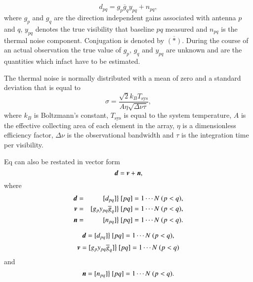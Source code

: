 \documentclass[a4paper,fleqn,usenatbib]{mnras}
\newcommand{\bd}{\bmath{d}}
\newcommand{\bv}{\bmath{v}}
\newcommand{\bn}{\bmath{n}}
\newcommand{\conj}[1]{\overline{#1}}
\begin{document}
\begin{equation}
d_{pq} = g_{p}\conj{g}_{q}y_{pq} + n_{pq},
\end{equation}
where $g_{p}$ and $g_{q}$ are the direction independent gains associated with antenna $p$ and $q$, $y_{pq}$ denotes the true visibility that baseline $pq$ measured
and $n_{pq}$ is the thermal noise component. Conjugation is denoted by $\conj{(*)}$. During the course of an actual observation the true value of $g_p$, $g_q$ and $y_{pq}$ are unknown and are the quantities which infact have 
to be estimated.

The thermal noise is normally distributed with a mean of zero and a standard deviation that is equal to  
\begin{equation}
\sigma = \frac{\sqrt{2}k_{B}T_{\textrm{sys}}}{A\eta\sqrt{\Delta \nu \tau}}, 
\end{equation}
where $k_B$ is Boltzmann's constant, $T_{\textrm{sys}}$ is equal to the system temperature, $A$ is the effective collecting area of each element in the array, $\eta$ is a dimensionless
efficiency factor, $\Delta \nu$ is the observational bandwidth and $\tau$ is the integration time per visibility. 

Eq can also be restated in vector form 
\begin{equation}
\bd = \bv + \bn, 
\end{equation}
where 
\begin{eqnarray}
 \bd &=& [d_{pq}] \big \} ~ [pq] = 1\cdots N ~ (p<q),\nonumber\\
 \bv &=& [g_p y_{pq}\conj{g}_q]  \big \} ~ [pq] = 1\cdots N ~ (p<q),\nonumber\\
 \bn &=& [n_{pq}]  \big \} ~ [pq] = 1\cdots N ~ (p<q).
\end{eqnarray}


\begin{equation}
  \bd = [d_{pq}] \big \} ~ [pq] = 1\cdots N ~ (p<q),
\end{equation}
\begin{equation}
  \bv = [g_p y_{pq}\conj{g}_q]  \big \} ~ [pq] = 1\cdots N ~ (p<q)
\end{equation}
and
\begin{equation}
  \bn = [n_{pq}]  \big \} ~ [pq] = 1\cdots N ~ (p<q).
\end{equation}
\end{document}
